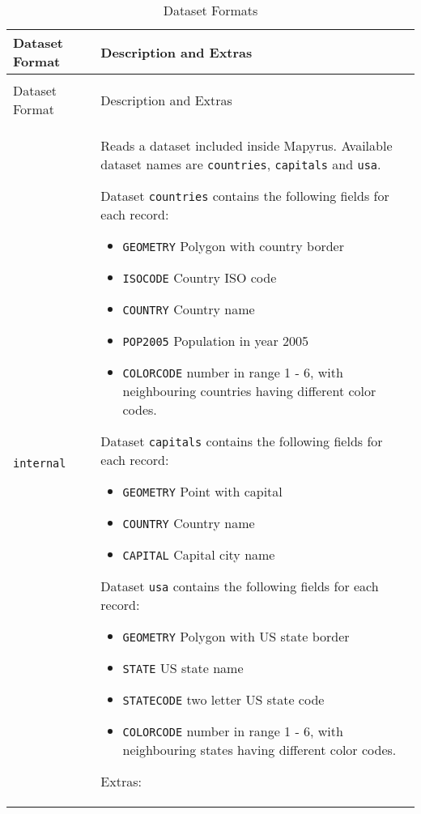 \begin{longtable}{|p{3cm}|p{10cm}|}
\hline
\label{datasettypes}
Dataset Format & Description and Extras \\
\hline
\hline
\endfirsthead
\hline
\caption{Dataset Formats} \\
\endfoot

\hline
Dataset Format & Description and Extras \\
\hline
\hline
\endhead

\texttt{internal} &
Reads a dataset included inside Mapyrus.
Available dataset names are \texttt{countries},
\texttt{capitals} and \texttt{usa}.

Dataset \texttt{countries} contains the following
fields for each record:

\begin{itemize}
\item
\texttt{GEOMETRY} Polygon with country border
\item
\texttt{ISOCODE} Country ISO code
\item
\texttt{COUNTRY} Country name
\item
\texttt{POP2005} Population in year 2005
\item
\texttt{COLORCODE} number in range 1 - 6, with neighbouring countries
having different color codes.
\end{itemize}

Dataset \texttt{capitals} contains the following
fields for each record:

\begin{itemize}
\item
\texttt{GEOMETRY} Point with capital
\item
\texttt{COUNTRY} Country name
\item
\texttt{CAPITAL} Capital city name
\end{itemize}

Dataset \texttt{usa} contains the following
fields for each record:

\begin{itemize}
\item
\texttt{GEOMETRY} Polygon with US state border
\item
\texttt{STATE} US state name
\item
\texttt{STATECODE} two letter US state code
\item
\texttt{COLORCODE} number in range 1 - 6, with neighbouring states
having different color codes.
\end{itemize}

\vspace{10pt}
Extras:


\end{longtable}
